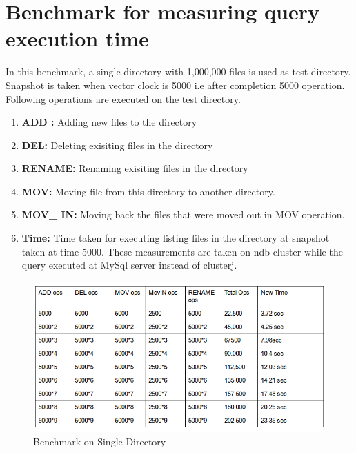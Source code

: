 \section{Benchmark for measuring query execution time}
In this benchmark, a single directory with 1,000,000 files is used as test directory. Snapshot is taken when vector clock is 5000 i.e after completion 5000 operation. Following operations are executed on the test directory.
\begin{enumerate}
\item \textbf{ADD :} Adding new files to the directory
\item \textbf{DEL:} Deleting exisiting files in the directory
\item \textbf{RENAME:} Renaming exisiting files in the directory
\item \textbf{MOV:} Moving file from this directory to another directory.
\item \textbf{MOV\_ IN:} Moving back the files that were moved out in MOV operation.
\item \textbf{Time:} Time taken for executing listing files in the directory at snapshot taken at time 5000.
These measurements are taken on ndb cluster while the query executed at MySql server instead of clusterj.
\end{enumerate}
\begin{figure}[tbh]
\centering  
 \includegraphics[scale=0.8]{figs/preliminar/Benchmark1.png}
  \caption{Benchmark on Single Directory}
  \label{fig:Benchmark1}
\end{figure}
